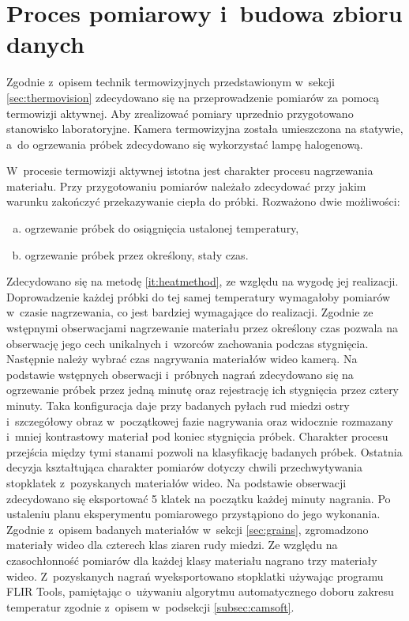 \section{Proces pomiarowy i~budowa zbioru danych} \label{sec:meas}
Zgodnie z~opisem technik termowizyjnych przedstawionym w~sekcji
\ref{sec:thermovision} zdecydowano się na przeprowadzenie pomiarów za pomocą
termowizji aktywnej.
Aby zrealizować pomiary uprzednio przygotowano stanowisko laboratoryjne.
Kamera termowizyjna została umieszczona na statywie, a~do ogrzewania próbek
zdecydowano się wykorzystać lampę halogenową.

W~procesie termowizji aktywnej istotna jest charakter procesu nagrzewania
materiału.
Przy przygotowaniu pomiarów należało zdecydować przy jakim warunku zakończyć
przekazywanie ciepła do próbki.
Rozważono dwie możliwości:
\begin{enumerate}[a)]
	\item ogrzewanie próbek do osiągnięcia ustalonej temperatury,
	\item \label{it:heatmethod} ogrzewanie próbek przez określony, stały czas.
\end{enumerate}
Zdecydowano się na metodę \ref{it:heatmethod}, ze względu na wygodę jej
realizacji.
Doprowadzenie każdej próbki do tej samej temperatury wymagałoby pomiarów
w~czasie nagrzewania, co jest bardziej wymagające do realizacji.
Zgodnie ze wstępnymi obserwacjami nagrzewanie materiału przez określony
czas pozwala na obserwację jego cech unikalnych i~wzorców zachowania podczas
stygnięcia.
Następnie należy wybrać czas nagrywania materiałów wideo kamerą.
Na podstawie wstępnych obserwacji i~próbnych nagrań zdecydowano się na
ogrzewanie próbek przez jedną minutę oraz rejestrację ich stygnięcia przez
cztery minuty.
Taka konfiguracja daje przy badanych pyłach rud miedzi ostry i~szczegółowy
obraz w~początkowej fazie nagrywania oraz widocznie rozmazany i~mniej
kontrastowy materiał pod koniec stygnięcia próbek.
Charakter procesu przejścia między tymi stanami pozwoli na klasyfikację
badanych próbek.
Ostatnia decyzja kształtująca charakter pomiarów dotyczy chwili
przechwytywania stopklatek z~pozyskanych materiałów wideo.
Na podstawie obserwacji zdecydowano się eksportować 5 klatek na początku
każdej minuty nagrania.
Po ustaleniu planu eksperymentu pomiarowego przystąpiono do jego wykonania.
Zgodnie z~opisem badanych materiałów w~sekcji \ref{sec:grains}, zgromadzono
materiały wideo dla czterech klas ziaren rudy miedzi.
Ze względu na czasochłonność pomiarów dla każdej klasy materiału nagrano trzy
materiały wideo.
Z~pozyskanych nagrań wyeksportowano stopklatki używając programu FLIR Tools,
pamiętając o~używaniu algorytmu automatycznego doboru zakresu temperatur
zgodnie z~opisem w~podsekcji \ref{subsec:camsoft}.

